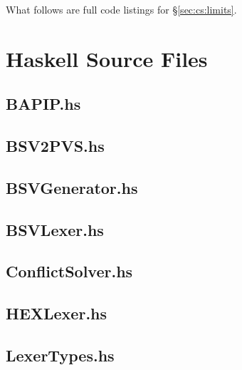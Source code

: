What follows are full code listings for \S \ref{sec:cs:limits}.  

\section{Haskell Source Files} \label{app:bapip:hs}
\subsection{BAPIP.hs} \label{app:bapip:hs:top}


\subsection{BSV2PVS.hs} \label{app:bapip:hs:bsv2pvs}


\subsection{BSVGenerator.hs} \label{app:bapip:hs:bsvgen}


\subsection{BSVLexer.hs} \label{app:bapip:hs:bsvlex}


\subsection{ConflictSolver.hs} \label{app:bapip:hs:conflict}


\subsection{HEXLexer.hs} \label{app:bapip:hs:hexlex}


\subsection{LexerTypes.hs} \label{app:bapip:hs:types}


